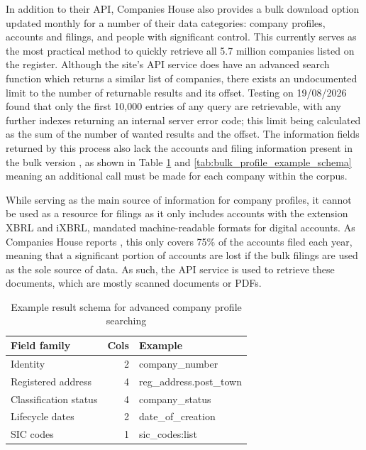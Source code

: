 \documentclass[ %
                    author={Natchalin Iwsakul \\ Inkaphol Siriwongwattana \\ Tanaphan Kummaraphat \\ Patorn Srisupap},
                supervisor={Fernando Moreno-Pino},
                    degree={MSc},
                     title={Propensity Modelling for SME Commercial Lending Using Open Public Data},
                  subtitle={Companies House filings and GDELT media coverage as predictors of first-time borrowing},
                      type={},
                      year={2026}]{dissertation}
\begin{document}
In addition to their API, Companies House also provides a bulk download option updated monthly for a number of their data categories: company profiles, accounts and filings, and people with significant control. This currently serves as the most practical method to quickly retrieve all 5.7 million companies listed on the register. Although the site's API service does have an advanced search function which returns a similar list of companies, there exists an undocumented limit to the number of returnable results and its offset. Testing on 19/08/2026 found that only the first 10,000 entries of any query are retrievable, with any further indexes returning an internal server error code; this limit being calculated as the sum of the number of wanted results and the offset. The information fields returned by this process also lack the accounts and filing information present in the bulk version \cite{CH_advanced_company_search_example}, as shown in Table \ref{tab:advanced_search_example_schema} and \ref{tab:bulk_profile_example_schema} meaning an additional call must be made for each company within the corpus.

While serving as the main source of information for company profiles, it cannot be used as a resource for filings as it only includes accounts with the extension XBRL and iXBRL, mandated machine-readable formats for digital accounts. As Companies House reports \cite{CH_bulk_filings}, this only covers 75\% of the accounts filed each year, meaning that a significant portion of accounts are lost if the bulk filings are used as the sole source of data. As such, the API service is used to retrieve these documents, which are mostly scanned documents or PDFs.

\begin{table}[h]
    \centering

    \begin{tabular}{lrl}
        \toprule
        Field family & Cols	& Example \\
        \midrule
        Identity & 2 & company\_number \\
        Registered address & 4 & reg\_address.post\_town \\
        Classification status & 4 & company\_status \\
        Lifecycle dates & 2 & date\_of\_creation \\
        SIC codes & 1 & sic\_codes:list \\
        \bottomrule
    \end{tabular}
    \caption{Example result schema for advanced company profile searching}
    \label{tab:advanced_search_example_schema}
\end{table}
\end{document}
